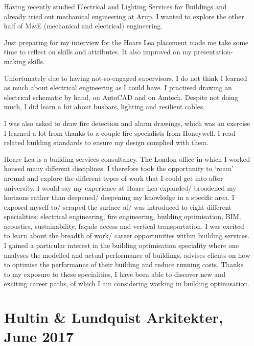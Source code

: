 Having recently studied Electrical and Lighting Services for Buildings and already tried out mechanical engineering at Arup, I wanted to explore the other half of M\&E (mechanical and electrical) engineering.

Just preparing for my interview for the Hoare Lea placement made me take some time to reflect on skills and attributes.
It also improved on my presentation-making skills.

Unfortunately due to having not-so-engaged supervisors, I do not think I learned as much about electrical engineering as I could have.
I practised drawing an electrical schematic by hand, on AutoCAD and on Amtech.
Despite not doing much, I did learn a bit about busbars, lighting and resilient cables.

I was also asked to draw fire detection and alarm drawings, which was an exercise I learned a lot from thanks to a couple fire specialists from Honeywell.
I read related building standards to ensure my design complied with them.

Hoare Lea is a building services consultancy.
The London office in which I worked housed many different disciplines.
I therefore took the opportunity to `roam' around and explore the different types of work that I could get into after university.
I would say my experience at Hoare Lea expanded/ broadened my horizons rather than deepened/ deepening my knowledge in a specific area.
I exposed myself to/ scraped the surface of/ was introduced to eight different specialities:
electrical engineering,
fire engineering,
building optimisation,
BIM,
acoustics,
sustainability,
façade access and
vertical transportation.
I was excited to learn about the breadth of work/ career opportunities within building services.
I gained a particular interest in the building optimisation speciality where one analyses the modelled and actual performance of buildings, advises clients on how to optimise the performance of their building and reduce running costs.
Thanks to my exposure to these specialities, I have been able to discover new and exciting career paths, of which I am considering working in building optimisation.




\section{Hultin \& Lundquist Arkitekter, June 2017}

